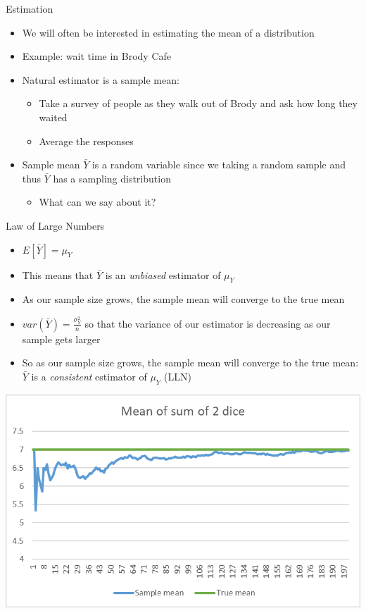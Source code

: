 \documentclass[aspectratio=169]{beamer}
\begin{document}
\begin{frame}{Estimation}
    \begin{itemize}
        \item We will often be interested in estimating the mean of a distribution
        \item Example: wait time in Brody Cafe
        \item Natural estimator is a sample mean:
        \begin{itemize}
            \item Take a survey of people as they walk out of Brody and ask how long they waited
            \item Average the responses
        \end{itemize}
        \item Sample mean $\bar{Y}$ is a random variable since we taking a random sample and thus $\bar{Y}$ has a sampling distribution
        \begin{itemize}
            \item What can we say about it?
        \end{itemize}
    \end{itemize}
\end{frame}

\begin{frame}{Law of Large Numbers}
    \begin{itemize}
        \item $E[\bar{Y}] = \mu_Y$ 
        \item This means that $\bar{Y}$ is an \textit{unbiased} estimator of $\mu_Y$
        \item As our sample size grows, the sample mean will converge to the true mean
        \item $var(\bar{Y}) = \frac{\sigma_Y^2}{n}$ so that the variance of our estimator is decreasing as our sample gets larger
        \item So as our sample size grows, the sample mean will converge to the true mean: $\bar{Y}$ is a \textit{consistent} estimator of $\mu_Y$ (LLN)
    \end{itemize}
\end{frame}

\begin{frame}
    \centering
    \includegraphics[width = .8\textwidth,keepaspectratio]{LLN.png}
\end{frame}
\end{document}
